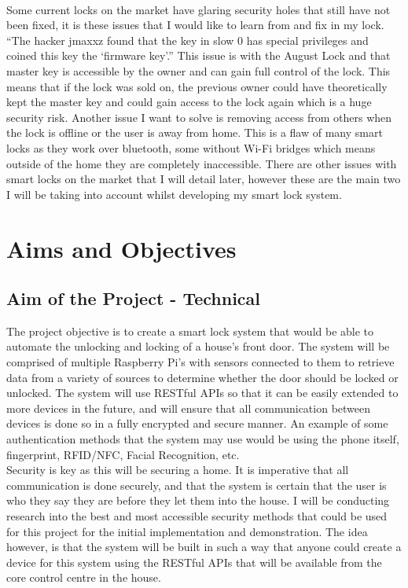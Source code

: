 \\
\indent Some current locks on the market have glaring security holes that still have not been fixed, it is these issues that I would like to learn from and fix in my lock. ``The hacker jmaxxz found that the key in slow 0 has special privileges and coined this key the `firmware key'.'' \citep{Fuller2017} This issue is with the August Lock and that master key is accessible by the owner and can gain full control of the lock. This means that if the lock was sold on, the previous owner could have theoretically kept the master key and could gain access to the lock again which is a huge security risk. Another issue I want to solve is removing access from others when the lock is offline or the user is away from home. This is a flaw of many smart locks as they work over bluetooth, some without Wi-Fi bridges which means outside of the home they are completely inaccessible. There are other issues with smart locks on the market that I will detail later, however these are the main two I will be taking into account whilst developing my smart lock system.

\section{Aims and Objectives}

\subsection{Aim of the Project - Technical}
The project objective is to create a smart lock system that would be able to automate the unlocking and locking of a house's front door. The system will be comprised of multiple Raspberry Pi's with sensors connected to them to retrieve data from a variety of sources to determine whether the door should be locked or unlocked. The system will use RESTful APIs so that it can be easily extended to more devices in the future, and will ensure that all communication between devices is done so in a fully encrypted and secure manner. An example of some authentication methods that the system may use would be using the phone itself, fingerprint, RFID/NFC, Facial Recognition, etc.
\\
\indent Security is key as this will be securing a home. It is imperative that all communication is done securely, and that the system is certain that the user is who they say they are before they let them into the house. I will be conducting research into the best and most accessible security methods that could be used for this project for the initial implementation and demonstration. The idea however, is that the system will be built in such a way that anyone could create a device for this system using the RESTful APIs that will be available from the core control centre in the house.

